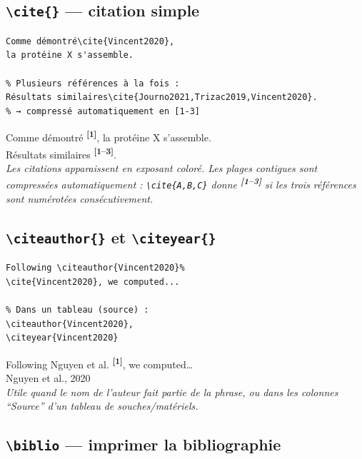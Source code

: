 \documentclass[12pt, a4paper]{article}
\newcommand{\simcite}[1]{%
  \textsuperscript{\textcolor{ENSorange}{\bfseries[#1]}}}
\begin{document}
\subsection{\texttt{\textbackslash cite\{\}} — citation simple}

\begin{demo}
\begin{lstlisting}[style=latexcode]
Comme démontré\cite{Vincent2020},
la protéine X s'assemble.

% Plusieurs références à la fois :
Résultats similaires\cite{Journo2021,Trizac2019,Vincent2020}.
% → compressé automatiquement en [1-3]
\end{lstlisting}
\tcblower
Comme démontré\simcite{1}, la protéine X s'assemble.\\[6pt]
Résultats similaires\simcite{1--3}.\\[8pt]
{\footnotesize\itshape Les citations apparaissent en exposant coloré. Les plages contigues sont compressées automatiquement : \texttt{\textbackslash cite\{A,B,C\}} donne \simcite{1--3} si les trois références sont numérotées consécutivement.}
\end{demo}

\subsection[\texttt{\textbackslash citeauthor} et \texttt{\textbackslash citeyear}]{\texttt{\textbackslash citeauthor\{\}} et \texttt{\textbackslash citeyear\{\}}}

\begin{demo}
\begin{lstlisting}[style=latexcode]
% Auteur visible dans la phrase :
Following \citeauthor{Vincent2020}%
\cite{Vincent2020}, we computed...

% Dans un tableau (source) :
\citeauthor{Vincent2020},
\citeyear{Vincent2020}
\end{lstlisting}
\tcblower
Following Nguyen et al.\simcite{1}, we computed\ldots\\[8pt]
Nguyen et al., 2020\\[8pt]
{\footnotesize\itshape Utile quand le nom de l'auteur fait partie de la phrase, ou dans les colonnes ``Source'' d'un tableau de souches/matériels.}
\end{demo}

\subsection{\texttt{\textbackslash biblio} — imprimer la bibliographie}
\end{document}
